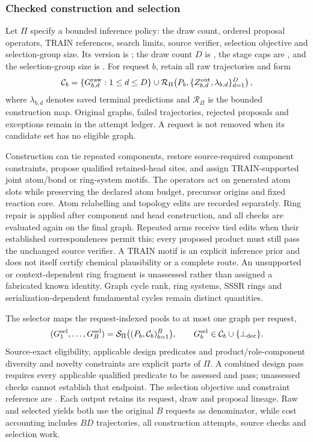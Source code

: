 \subsubsection{Checked construction and selection}

Let $\Pi$ specify a bounded inference policy: the draw count, ordered proposal operators, TRAIN
references, search limits, source verifier, selection objective and selection-group size. Its
version is ; the draw count $D$ is ,
the stage caps are , and the selection-group size is
. For request $b$, retain all raw trajectories and form
\begin{equation}
 \mathcal C_b=\{G^{\rm raw}_{b,d}:1\leq d\leq D\}
 \cup\mathcal R_\Pi\!\left(P_b,\{Z^{\rm out}_{b,d},\lambda_{b,d}\}_{d=1}^{D}\right),
\end{equation}
where $\lambda_{b,d}$ denotes saved terminal predictions and $\mathcal R_\Pi$ is the bounded
construction map. Original graphs, failed trajectories, rejected proposals and exceptions remain
in the attempt ledger. A request is not removed when its candidate set has no eligible graph.

Construction can tie repeated components, restore source-required component constraints, propose
qualified retained-head sites, and assign TRAIN-supported joint atom/bond or ring-system motifs.
The operators act on generated atom slots while preserving the declared atom budget, precursor
origins and fixed reaction core. Atom relabelling and topology edits are recorded separately.
Ring repair is applied after component and head construction, and all checks are evaluated again
on the final graph. Repeated arms receive tied edits when their established correspondences permit
this; every proposed product must still pass the unchanged source verifier. A TRAIN motif is an
explicit inference prior and does not itself certify chemical plausibility or a complete route.
An unsupported or context-dependent ring fragment is unassessed rather than assigned a fabricated
known identity. Graph cycle rank, ring systems, SSSR rings and serialization-dependent fundamental
cycles remain distinct quantities.

The selector maps the request-indexed pools to at most one graph per request,
\begin{equation}
 (G^{\rm sel}_1,\ldots,G^{\rm sel}_B)
 =\mathcal S_\Pi\bigl((P_b,\mathcal C_b)_{b=1}^{B}\bigr),
 \qquad G^{\rm sel}_b\in\mathcal C_b\cup\{\bot_{\rm dec}\}.
\end{equation}
Source-exact eligibility, applicable design predicates and product/role-component diversity and
novelty constraints are explicit parts of $\Pi$. A combined design pass requires every applicable
qualified predicate to be assessed and pass; unassessed checks cannot establish that endpoint.
The selection objective and constraint reference are .
Each output retains its request, draw and proposal lineage. Raw and selected yields both use the
original $B$ requests as denominator, while cost accounting includes $BD$ trajectories, all
construction attempts, source checks and selection work.

